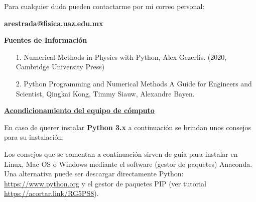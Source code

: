 \documentclass[12pt]{amsart} %
\begin{document}
\vspace{14pt}

Para cualquier duda pueden contactarme por mi correo personal:

\vspace{4pt}

\textbf{arestrada@fisica.uaz.edu.mx} 

\vspace*{22pt} %

\textbf{Fuentes de Información}
\vspace{10pt}
\begin{itemize}
	\item[1.] Numerical Methods in Physics with Python, Alex Gezerlis. (2020, Cambridge University Press)
	\item[2.] Python Programming and Numerical Methods A Guide for Engineers and Scientist, Qingkai Kong, Timmy Siauw, Alexandre Bayen.
\end{itemize}


\vspace*{22pt}

\uline{\large{\textbf{Acondicionamiento del equipo de cómputo}}}

\vspace*{14pt}

En caso de querer instalar  \textbf{Python 3.x} a continuación se brindan unos consejos para su instalación:
\vspace{14pt}


\hspace{0.375in} Los consejos que se comentan a continuación sirven de guía para instalar en Linux, Mac OS o Windows mediante el software (gestor de paquetes)  Anaconda. Una alternativa puede ser descargar directamente Python: \url{https://www.python.org} y  el gestor de paquetes PIP (ver tutorial \url{https://acortar.link/RG5PS8}).

\vspace{12pt}
\end{document}
